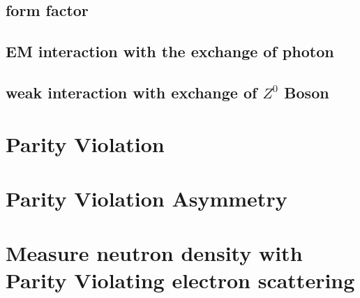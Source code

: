 \subsection{form factor}
\subsection{EM interaction with the exchange of photon}
\subsection{weak interaction with exchange of $Z^0$ Boson}
\section{Parity Violation}
\section{Parity Violation Asymmetry}
\section{Measure neutron density with Parity Violating electron scattering}





